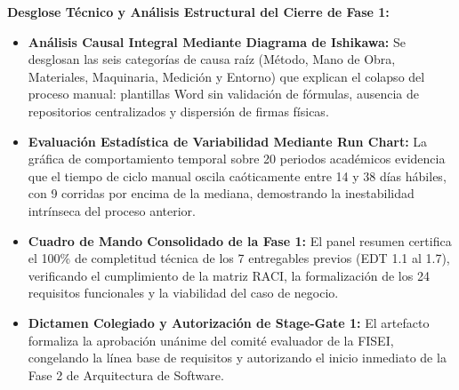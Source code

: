 \documentclass[12pt,a4paper]{article}
\begin{document}
\noindent
\textbf{Desglose Técnico y Análisis Estructural del Cierre de Fase 1:}
\begin{itemize}[leftmargin=1.5em, itemsep=3pt]
    \item \textbf{Análisis Causal Integral Mediante Diagrama de Ishikawa:} Se desglosan las seis categorías de causa raíz (Método, Mano de Obra, Materiales, Maquinaria, Medición y Entorno) que explican el colapso del proceso manual: plantillas Word sin validación de fórmulas, ausencia de repositorios centralizados y dispersión de firmas físicas.
    \item \textbf{Evaluación Estadística de Variabilidad Mediante Run Chart:} La gráfica de comportamiento temporal sobre 20 periodos académicos evidencia que el tiempo de ciclo manual oscila caóticamente entre 14 y 38 días hábiles, con 9 corridas por encima de la mediana, demostrando la inestabilidad intrínseca del proceso anterior.
    \item \textbf{Cuadro de Mando Consolidado de la Fase 1:} El panel resumen certifica el 100\% de completitud técnica de los 7 entregables previos (EDT 1.1 al 1.7), verificando el cumplimiento de la matriz RACI, la formalización de los 24 requisitos funcionales y la viabilidad del caso de negocio.
    \item \textbf{Dictamen Colegiado y Autorización de Stage-Gate 1:} El artefacto formaliza la aprobación unánime del comité evaluador de la FISEI, congelando la línea base de requisitos y autorizando el inicio inmediato de la Fase 2 de Arquitectura de Software.
\end{itemize}
\end{document}
